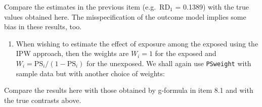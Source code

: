 \documentclass[
]{book}
\newenvironment{Shaded}{\begin{snugshade}}{\end{snugshade}}
\newcommand{\AttributeTok}[1]{\textcolor[rgb]{0.13,0.29,0.53}{#1}}
\newcommand{\DecValTok}[1]{\textcolor[rgb]{0.00,0.00,0.81}{#1}}
\newcommand{\FunctionTok}[1]{\textcolor[rgb]{0.13,0.29,0.53}{\textbf{#1}}}
\newcommand{\NormalTok}[1]{#1}
\newcommand{\OtherTok}[1]{\textcolor[rgb]{0.56,0.35,0.01}{#1}}
\newcommand{\SpecialCharTok}[1]{\textcolor[rgb]{0.81,0.36,0.00}{\textbf{#1}}}
\newcommand{\StringTok}[1]{\textcolor[rgb]{0.31,0.60,0.02}{#1}}
\providecommand{\tightlist}{%
  \setlength{\itemsep}{0pt}\setlength{\parskip}{0pt}}
\begin{document}
\begin{Shaded}
\end{Shaded}

Compare the estimates in the previous item (e.g.~RD\(_1\) = 0.1389) with
the true values obtained here. The misspecification of the outcome model
implies some bias in these results, too.

\begin{enumerate}
\def\labelenumi{\arabic{enumi}.}
\setcounter{enumi}{3}
\tightlist
\item
  When wishing to estimate the effect of exposure among the exposed
  using the IPW approach, then the weights are \(W_i = 1\) for the
  exposed and \(W_i = \text{PS}_i/(1-\text{PS}_i)\) for the unexposed.
  We shall again use \texttt{PSweight} with sample data but with another
  choice of weights:
\end{enumerate}

\begin{Shaded}
\end{Shaded}

Compare the results here with those obtained by g-formula in item 8.1
and with the true contrasts above.
\end{document}
